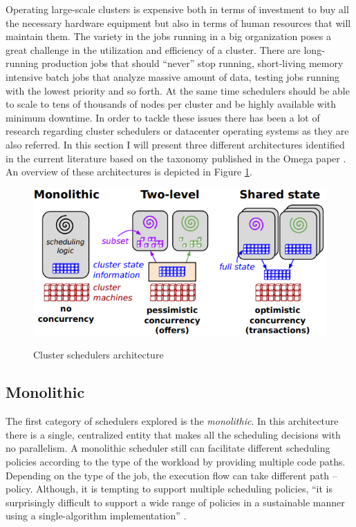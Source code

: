 Operating large-scale clusters is expensive both in terms of
investment to buy all the necessary hardware equipment but also in terms of
human resources that will maintain them. The variety in the jobs
running in a big organization poses a great challenge in the
utilization and efficiency of a cluster. There are long-running
production jobs that should ``never'' stop running, short-living
memory intensive batch jobs that analyze massive amount of data,
testing jobs running with the lowest priority and so forth. At the
same time schedulers should be able to scale to tens of thousands of
nodes per cluster and be highly available with minimum downtime. In order
to tackle these issues there has been a lot of research regarding cluster
schedulers or datacenter operating systems as they are also
referred. In this section I will present three different architectures
identified in the current literature based on the taxonomy published
in the Omega paper \cite{41684}. An overview of these architectures is
depicted in Figure \ref{fig:sch_tax}.

\begin{figure}
\centering
\includegraphics[scale=0.6]{resources/images/Background/schedulers_taxonomy.png}
\label{fig:sch_tax}
\caption{Cluster schedulers architecture \cite{41684}}
\end{figure}

\subsection{Monolithic}
\label{ssec:tax_monolithic}
The first category of schedulers explored is the \emph{monolithic}. In
this architecture there is a single, centralized entity that makes all
the scheduling decisions with no parallelism. A monolithic scheduler
still can facilitate different scheduling policies according to the type
of the workload by providing multiple code paths. Depending on the
type of the job, the execution flow can take different path --
policy. Although, it is tempting to support multiple
scheduling policies, ``it is surprisingly difficult to support a wide
range of policies in a sustainable manner using a single-algorithm
implementation'' \cite{41684}.

